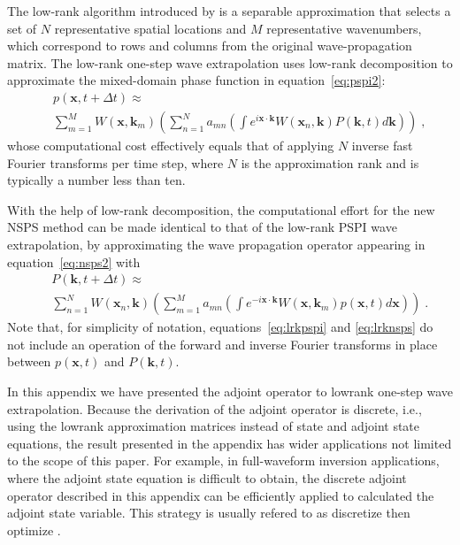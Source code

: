 The low-rank algorithm introduced by \cite{lowrank} is a separable approximation that selects a set of $N$ representative spatial locations and $M$ representative wavenumbers, which correspond to rows and columns from the original wave-propag\-ation matrix. The low-rank one-step wave extrapolation uses low-rank decomposition to approximate the mixed-domain phase function in equation~\ref{eq:pspi2}:
\begin{eqnarray}
\label{eq:lrkpspi}
&& p(\mathbf{x},t+\Delta t) \approx \\
&& \sum\limits_{m=1}^M W(\mathbf{x},\mathbf{k}_m) \left( \sum\limits_{n=1}^N a_{mn} \left(\int e^{i \mathbf{x} \cdot \mathbf{k}} W(\mathbf{x}_n,\mathbf{k}) P(\mathbf{k},t) d\mathbf{k} \right) \right)\; , \nonumber 
\end{eqnarray}
whose computational cost effectively equals that of applying $N$ inverse fast Fourier transforms per time step, where $N$ is the approximation rank and is typically a number less than ten.

With the help of low-rank decomposition, the computational effort for the new NSPS method can be made identical to that of the low-rank PSPI wave extrapolation, by approximating the wave propagation operator appearing in equation~\ref{eq:nsps2} with
\begin{eqnarray}
\label{eq:lrknsps}
&& P(\mathbf{k},t+\Delta t) \approx \\
&& \sum\limits_{n=1}^N W(\mathbf{x}_n,\mathbf{k}) \left( \sum\limits_{m=1}^M a_{mn} \left(\int e^{-i \mathbf{x} \cdot \mathbf{k}} W(\mathbf{x},\mathbf{k}_m) p(\mathbf{x},t) d\mathbf{x} \right) \right)\; . \nonumber 
\end{eqnarray}
Note that, for simplicity of notation, equations~\ref{eq:lrkpspi} and \ref{eq:lrknsps} do not include an operation of the forward and inverse Fourier transforms in place between $p(\mathbf{x},t)$ and $P(\mathbf{k},t)$. 

In this appendix we have presented the adjoint operator to lowrank one-step wave extrapolation. Because the derivation of the adjoint operator is discrete, i.e., using the lowrank approximation matrices instead of state and adjoint state equations, the result presented in the appendix has wider applications not limited to the scope of this paper. For example, in full-waveform inversion applications, where the adjoint state equation is difficult to obtain, the discrete adjoint operator described in this appendix can be efficiently applied to calculated the adjoint state variable. This strategy is usually refered to as discretize then optimize \cite[]{betts2010practical}.



